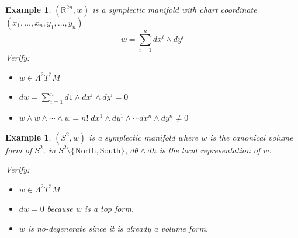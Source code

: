 \documentclass[11pt]{amsart}
\numberwithin{equation}{section}
\theoremstyle{plain}
\newtheorem{eg}[theorem]{Example}
\theoremstyle{plain}
\numberwithin{equation}{section}
\theoremstyle{remark}
\begin{document}
\begin{eg}
	$(\mathbb{R}^{2n},w)$ is a symplectic manifold with
	chart coordinate $(x_1,\ldots,x_n,y_1,\ldots,y_n)$
	$$w=\sum_{i=1}^n dx^i \wedge dy^i$$
	Verify:\begin{itemize}
		\item $w \in \Lambda^2 T^*M$
		\item $dw= \sum_{i=1}^n d1\wedge dx^i \wedge dy^i=0$
		\item $w \wedge w \wedge \cdots \wedge w=n!\; dx^1 \wedge dy^1 \wedge \cdots dx^n \wedge dy^n \neq 0$
	\end{itemize}
\end{eg}
\begin{eg}
	 $(S^2,w)$ is a symplectic manifold where $w$ is the canonical volume form of $S^2$. in $S^2\setminus \{\text{North},\text{South}\}$, $d\theta \wedge dh$ is the local representation of $w$.
	 
	Verify:\begin{itemize}
	\item $w \in \Lambda^2 T^*M$
	\item $dw=0$ because $w$ is a top form.
	\item $w$ is no-degenerate since it is already a volume form.
\end{itemize}
\end{eg}
\end{document}
